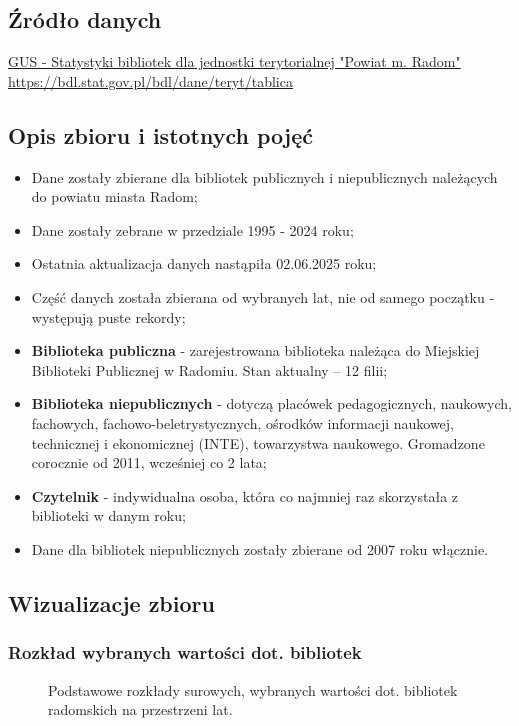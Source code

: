 \documentclass[12pt]{article}
\begin{document}
\subsection{Źródło danych}
\href{https://bdl.stat.gov.pl/bdl/dane/teryt/tablica}{GUS - Statystyki bibliotek dla jednostki terytorialnej "Powiat m. Radom"}\\
\url{https://bdl.stat.gov.pl/bdl/dane/teryt/tablica}

\subsection{Opis zbioru i istotnych pojęć}
\begin{itemize}
    \item Dane zostały zbierane dla bibliotek publicznych i niepublicznych należących do powiatu miasta Radom;
    \item Dane zostały zebrane w przedziale 1995 - 2024 roku;
    \item Ostatnia aktualizacja danych nastąpiła 02.06.2025 roku;
    \item Część danych została zbierana od wybranych lat, nie od samego początku - występują puste rekordy;
    \item \textbf{Biblioteka publiczna} - zarejestrowana biblioteka należąca do Miejskiej Biblioteki Publicznej w Radomiu. Stan aktualny – 12 filii;
    \item \textbf{Biblioteka niepublicznych} - dotyczą placówek pedagogicznych, naukowych, fachowych, fachowo-beletrystycznych, ośrodków informacji naukowej, 
                                        technicznej i ekonomicznej (INTE), towarzystwa naukowego. Gromadzone corocznie od 2011, wcześniej co 2 lata;
    \item \textbf{Czytelnik} - indywidualna osoba, która co najmniej raz skorzystała z biblioteki w danym roku;
    \item Dane dla bibliotek niepublicznych zostały zbierane od 2007 roku włącznie.
\end{itemize}


\subsection{Wizualizacje zbioru}

\subsubsection{Rozkład wybranych wartości dot. bibliotek}
\begin{figure}[H]
    
    \caption{Podstawowe rozkłady surowych, wybranych wartości dot. bibliotek radomskich na przestrzeni lat.}
\end{figure}
\end{document}
